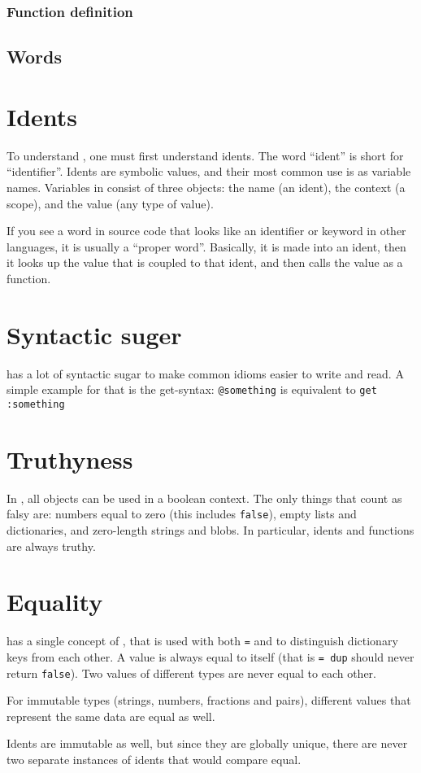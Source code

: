 \subsubsection{Function definition}
\subsection{Words}
\section{Idents}
To understand \dv, one must first understand idents. The word
``ident'' is short for ``identifier''. Idents are symbolic values,
and their most common use is as variable names. Variables in \dv{}
consist of three objects: the name (an ident), the context (a scope),
and the value (any type of value).

If you see a word in \dv{} source code that looks like an identifier or
keyword in other languages, it is usually a ``proper word''. Basically, it is made into an
ident, then it looks up the value that is coupled to that ident, and
then calls the value as a function.

\section{Syntactic suger}
\dv{} has a lot of syntactic sugar to make common idioms easier to write
and read. A simple example for that is the get-syntax: \verb!@something!
is equivalent to \verb!get :something!

\section{Truthyness}

In \dv{}, all objects can be used in a boolean context. The only things that
count as falsy are: numbers equal to zero (this includes \verb!false!), empty
lists and dictionaries, and zero-length strings and blobs. In particular, idents
and functions are always truthy.

\section{Equality}

\dv{} has a single concept of , that is used with both
\verb!=! and to distinguish dictionary keys from each other. A value is always
equal to itself (that is \verb!= dup! should never return \verb!false!). Two values of different types are never equal to each other.

For immutable types (strings, numbers, fractions and pairs), different values
that represent the same data are equal as well.

Idents are immutable as well, but since they are globally unique, there are never two separate instances of idents that would compare equal.
